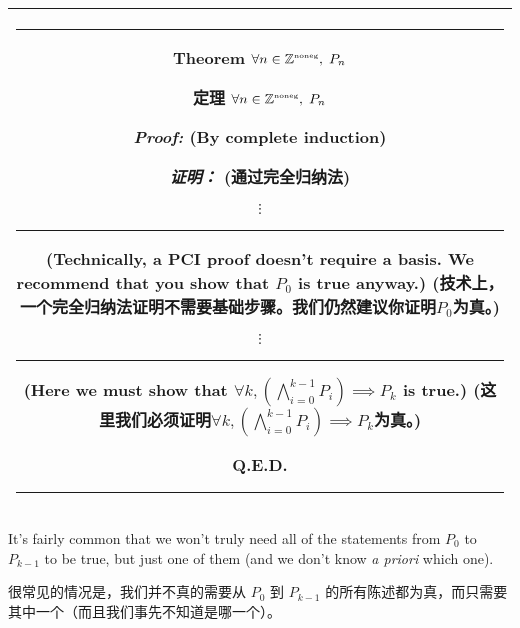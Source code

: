 \begin{center}
\begin{tabular}{|c|} \hline
\rule{16pt}{0pt}\begin{minipage}{.75\textwidth}

\rule{0pt}{16pt}{\bf \large Theorem} $ \displaystyle \forall n \in {\mathbb Z}^{\mbox{\tiny noneg}}, \; P_n $

{\bf \large 定理} $ \displaystyle \forall n \in {\mathbb Z}^{\mbox{\tiny noneg}}, \; P_n $
\medskip

\rule{0pt}{20pt} {\em Proof:} (By complete induction)

{\em 证明：} (通过完全归纳法)

\noindent {\bf Basis:}

\noindent {\bf 基础步骤：}

\begin{center}
$\vdots$ \rule{36pt}{0pt} \begin{minipage}[c]{1.7 in} (Technically, a PCI %
proof doesn't require a basis.   We recommend that you show that $P_0$ %
is true anyway.) (技术上，一个完全归纳法证明不需要基础步骤。我们仍然建议你证明$P_0$为真。) \end{minipage}
\end{center}

\noindent {\bf Inductive step:}

\noindent {\bf 归纳步骤：}

\begin{center}
$\vdots$ \rule{36pt}{0pt} \begin{minipage}[c]{1.7 in} (Here we must show that $\forall k,  \left( \bigwedge_{i=0}^{k-1} P_i \right) \implies P_{k}$ is true.) (这里我们必须证明$\forall k,  \left( \bigwedge_{i=0}^{k-1} P_i \right) \implies P_{k}$为真。) \end{minipage}
\end{center}

\rule{0pt}{0pt} \hspace{\fill} Q.E.D.
\rule[-10pt]{0pt}{16pt}
\end{minipage} \rule{16pt}{0pt} \\ \hline
\end{tabular}
\end{center}
\medskip

It's fairly common that we won't truly need all of the statements from $P_0$
to $P_{k-1}$ to be true, but just one of them (and we don't know {\em a priori} 
which one).

很常见的情况是，我们并不真的需要从 $P_0$ 到 $P_{k-1}$ 的所有陈述都为真，而只需要其中一个（而且我们事先不知道是哪一个）。

